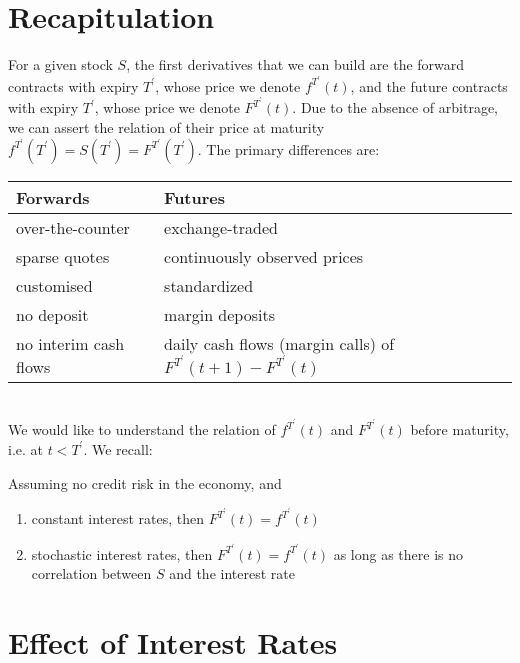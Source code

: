 \documentclass[11pt]{article}
\date{Lecture 3 (22 Jan. 2013)}
\begin{document}
{\small \maketitle}

\section{Recapitulation}
For a given stock $S$, the first derivatives that we can build are the forward contracts with expiry $T^\prime$, whose price we denote $f^{T^\prime}(t)$, and the future contracts with expiry $T^\prime$, whose price we denote $F^{T^\prime}(t)$. Due to the absence of arbitrage, we can assert the relation of their price at maturity $f^{T^\prime}(T^\prime) = S(T^\prime) = F^{T^\prime}(T^\prime)$. The primary differences are: \\

\begin{tabular}{l | l}
Forwards & Futures \\
\hline
over-the-counter & exchange-traded \\
sparse quotes & continuously observed prices \\
customised & standardized \\
no deposit & margin deposits \\
no interim cash flows & daily cash flows (margin calls) of $F^{T^\prime}(t + 1) - F^{T^\prime}(t)$ \\
\end{tabular} \\

We would like to understand the relation of $f^{T^\prime}(t)$ and $F^{T^\prime}(t)$ before maturity, i.e. at $t < T^\prime$. We recall:

\begin{theorem} Assuming no credit risk in the economy, and
\begin{enumerate}
\item constant interest rates, then $F^{T^\prime}(t) = f^{T^\prime}(t)$
\item stochastic interest rates, then $F^{T^\prime}(t) = f^{T^\prime}(t)$ as long as there is no correlation between $S$ and the interest rate
\end{enumerate}
\end{theorem}

\section{Effect of Interest Rates}
\end{document}
